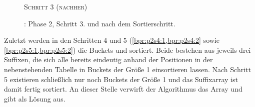 \begin{figure}[H]
    {\centering\begin{minipage}{\textwidth}
        {\large \textsc{Schritt 3 (nachher)}}\par\medskip
    \end{minipage}}
    \caption[\bpr: Phase 2, Schritt 3 (nachher)]{\bpr: Phase 2, Schritt 3. \sa und \bptr nach dem Sortierschritt.}
    \label{bpr:p2s3:2}
\end{figure}
Zuletzt werden in den Schritten 4 und 5 (\cref{bpr:p2s4:1,bpr:p2s4:2} sowie \cref{bpr:p2s5:1,bpr:p2s5:2}) die Buckets  und  sortiert. Beide bestehen aus jeweils drei Suffixen, die sich alle bereits eindeutig anhand der Positionen in der nebenstehenden Tabelle in Buckets der Größe 1 einsortieren lassen. Nach Schritt 5 existieren schließlich nur noch Buckets der Größe 1 und das Suffixarray ist damit fertig sortiert. An dieser Stelle verwirft der Algorithmus das Array \bptr und gibt \sa als Lösung aus.

